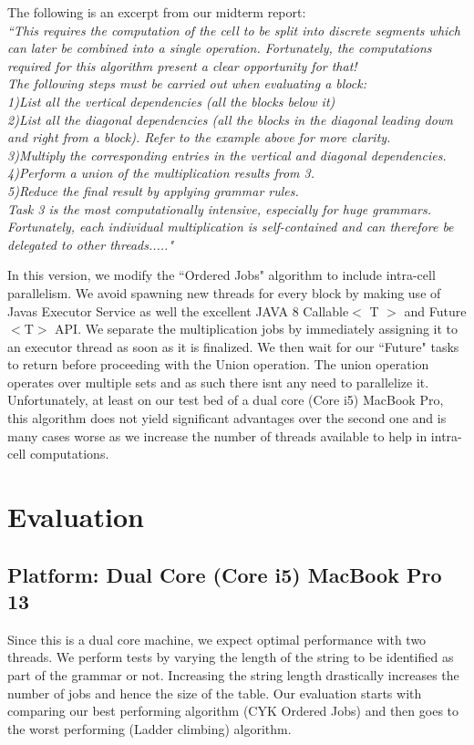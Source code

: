 \documentclass[12pt]{article}
\begin{document}
The following is an excerpt from our midterm report: \\

\textit{
\footnotesize	{
``This requires the computation of the cell to be split into discrete segments which can later be combined into a single operation. Fortunately, the computations required for this algorithm present a clear opportunity for that!\\ The following steps must be carried out when evaluating a block: \\
1)List all the vertical dependencies (all the blocks below it)\\
2)List all the diagonal dependencies (all the blocks in the diagonal leading down and right from a block). Refer to the example above for more clarity.\\
3)Multiply the corresponding entries in the vertical and diagonal dependencies.\\
4)Perform a union of the multiplication results from 3.\\
5)Reduce the final result by applying grammar rules.\\
Task 3 is the most computationally intensive, especially for huge grammars. Fortunately, each individual multiplication is self-contained and can therefore be delegated to other threads....."}}

\vspace{5 mm}
In this version, we modify the ``Ordered Jobs" algorithm to include intra-cell parallelism. We avoid spawning new threads for every block by making use of Java\textsc{}s Executor Service as well the excellent JAVA 8 Callable$<$ T $>$ and Future $<$T$>$ API. We separate the multiplication jobs by immediately assigning it to an executor thread as soon as it is finalized. We then wait for our ``Future" tasks to return before proceeding with the Union operation. The union operation operates over multiple sets and as such there isn\textsc{}t any need to parallelize it. Unfortunately, at least on our test bed of a dual core (Core i5) MacBook Pro, this algorithm does not yield significant advantages over the second one and is many cases worse as we increase the number of threads available to help in intra-cell computations.


\vspace{5 mm}
\section{Evaluation}
\subsection{Platform: Dual Core (Core i5) MacBook Pro 13}
Since this is a dual core machine, we expect optimal performance with two threads. 
We perform tests by varying the length of the string to be identified as part of the grammar or not. Increasing the string length drastically increases the number of jobs and hence the size of the table. Our evaluation starts with comparing our best performing algorithm (CYK Ordered Jobs) and then goes to the worst performing (Ladder climbing) algorithm.\\
\end{document}
